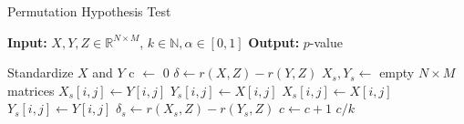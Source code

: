 \begin{algorithm}[t]
{\small
\caption{Permutation Hypothesis Test}
\label{alg:permutation}
\hspace*{\algorithmicindent} \textbf{Input:} $X, Y, Z \in \mathbb{R}^{N\times M}$, $k \in \mathbb{N}, \alpha \in [0, 1]$
\hspace*{\algorithmicindent} \textbf{Output:} $p$-value
\begin{algorithmic}[1]
\State Standardize $X$ and $Y$
\State c $\gets$ 0
\State $\delta \gets r(X, Z) - r(Y, Z)$
    \State $X_s, Y_s \gets$ empty $N \times M$ matrices
         
            \State $X_s[i, j] \gets Y[i, j]$
            \State $Y_s[i, j] \gets X[i, j]$
        \Else {}
            \State $X_s[i, j] \gets X[i, j]$
            \State $Y_s[i, j] \gets Y[i, j]$
        \EndIf
    \EndFor
    \State $\delta_s \gets r(X_s, Z) - r(Y_s, Z)$
        \State $c \gets c + 1$
    \EndIf
\EndFor
\State \Return $c / k$
\end{algorithmic}
}
\end{algorithm}
